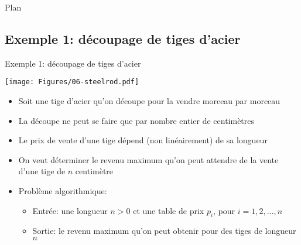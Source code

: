 \begin{frame}{Plan}


\end{frame}

\subsection{Exemple 1: découpage de tiges d'acier}

\begin{frame}{Exemple 1: découpage de tiges d'acier}

\bigskip

\centerline{\texttt{[image: Figures/06-steelrod.pdf]}}

\bigskip

\begin{itemize}
\item Soit une tige d'acier qu'on découpe pour la vendre morceau par morceau
\item La découpe ne peut se faire que par nombre entier de centimètres
\item Le prix de vente d'une tige dépend (non linéairement) de sa longueur
\item On veut déterminer le revenu maximum qu'on peut attendre de la vente d'une tige de $n$ centimètre
\item Problème algorithmique:
\begin{itemize}
\item Entrée: une longueur $n>0$ et une table de prix $p_i$, pour $i=1,2,\ldots,n$
\item Sortie: le revenu maximum qu'on peut obtenir pour des tiges de longueur $n$
\end{itemize}
\end{itemize}
\end{frame}

